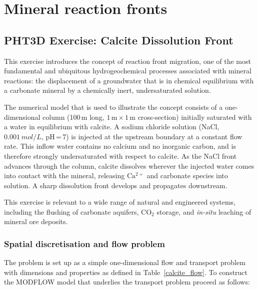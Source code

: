 \chapter[Evaluating mineral reaction fronts with PHT3D]{Mineral reaction fronts}
\def\shorttitle{Evaluating mineral reaction fronts with PHT3D} %


\section[PHT3D Exercise 1: Calcite Dissolution Front]{PHT3D Exercise: Calcite Dissolution Front}

This exercise introduces the concept of reaction front migration, one of the most fundamental and ubiquitous hydrogeochemical processes associated with mineral reactions: the displacement of a groundwater that is in chemical equilibrium with a carbonate mineral by a chemically inert, undersaturated solution.

The numerical model that is used to illustrate the concept consists of a one-dimensional column (100\,m long, $1\,\mathrm{m} \times 1\,\mathrm{m}$ cross-section) initially saturated with a water in equilibrium with calcite. A sodium chloride solution (NaCl, $0.001\ mol/L$, pH\,=\,7) is
injected at the upstream boundary at a constant flow rate.
This inflow water contains no calcium and no inorganic carbon, and is
therefore strongly undersaturated with respect to calcite.
As the NaCl front advances through the column, calcite dissolves wherever
the injected water comes into contact with the mineral, releasing
$\mathrm{Ca^{2+}}$ and carbonate species into solution.
A sharp dissolution front develops and propagates downstream.

This exercise is relevant to a wide range of natural and engineered
systems, including the flushing of carbonate aquifers, $\mathrm{CO_2}$
storage, and \textit{in-situ} leaching of mineral
ore deposits.

\subsection[Spatial discretisation and flow problem]{Spatial discretisation and flow problem}

The problem is set up as a simple one-dimensional flow and transport
problem with dimensions and properties as defined in
Table~\ref{calcite_flow}. To construct the MODFLOW model that underlies the transport problem proceed as follows:

